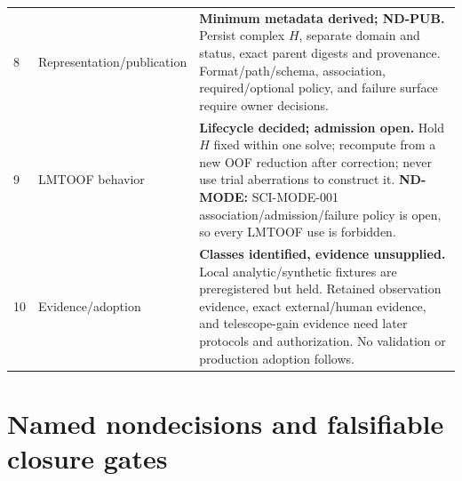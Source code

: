 \documentclass[11pt]{article}
\begin{document}
\begin{longtable}{@{}L{0.05\textwidth}L{0.24\textwidth}L{0.62\textwidth}@{}}
8 & Representation/publication & \textbf{Minimum metadata derived; ND-PUB.}
Persist complex $H$, separate domain and status, exact parent digests and
provenance.  Format/path/schema, association, required/optional policy, and
failure surface require owner decisions. \\
9 & LMTOOF behavior & \textbf{Lifecycle decided; admission open.}  Hold $H$
fixed within one solve; recompute from a new OOF reduction after correction;
never use trial aberrations to construct it.  \textbf{ND-MODE:} SCI-MODE-001
association/admission/failure policy is open, so every LMTOOF use is forbidden. \\
10 & Evidence/adoption & \textbf{Classes identified, evidence unsupplied.}
Local analytic/synthetic fixtures are preregistered but held.  Retained
observation evidence, exact external/human evidence, and telescope-gain
evidence need later protocols and authorization.  No validation or production
adoption follows. \\
\bottomrule
\end{longtable}

\section{Named nondecisions and falsifiable closure gates}
\end{document}
